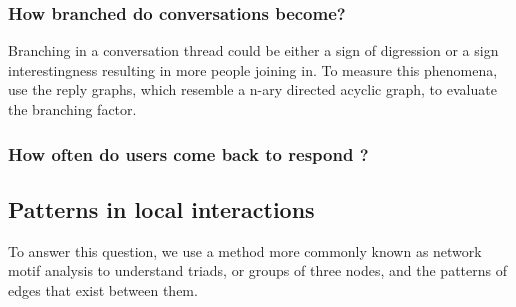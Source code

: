 \subsubsection{How branched do conversations become?}
Branching in a conversation thread could be either a sign of digression or a sign interestingness resulting in more people joining in. To measure this phenomena, use the reply graphs, which resemble a n-ary directed acyclic graph, to evaluate the branching factor. 

\subsubsection{How often do users come back to respond ? }



\subsection{Patterns in local interactions}
To answer this question, we use a method more commonly known as network motif analysis to understand triads, or groups of three nodes, and the patterns of edges that exist between them. 

